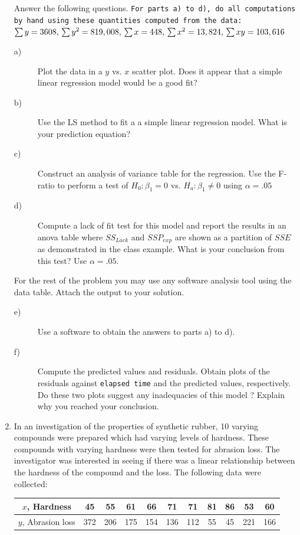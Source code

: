 \documentclass[12pt]{article}
\begin{document}
\begin{enumerate}
Answer the following questions. \texttt{For parts a) to d), do all 
computations by hand using these quantities computed from the data:}
$\sum y =3608, \,\sum y^2 =819,008, \\
\sum x =448, \,\sum x^2=13,824, \,\sum xy = 103,616$
\begin{description}
\item[a)] Plot the data in a $y$ vs. $x$ scatter plot. Does it appear that a simple
linear regression model would be a good fit?
\item[b)] Use the LS method to fit a  a simple
linear regression model. What is your prediction equation?
\item[c)] Construct an analysis of variance table for the regression.
Use the F-ratio to perform a test of $H_0:\beta_1 = 0$ vs. $H_a:\beta_1 \neq 0$
using $\alpha=.05$
\item[d)] Compute a  lack of fit test for this model and report the
results in an  anova table  where $SS_{Lack}$ and
$SSP_{exp}$ are shown as a partition of $SSE$ as demonstrated in the 
class example. What is your conclusion from this test? Use $\alpha=.05$.
\end{description}
For the rest of the problem you may use any software analysis tool using the data table. Attach the output to your solution.
\begin{description}
\item[e)] Use a software to obtain the answers to parts a) to d).
\item[f)] Compute the predicted values and
residuals. Obtain plots of the residuals against \texttt{elapsed time} and the
predicted values, respectively. Do these two plots suggest any 
inadequacies of this model ? Explain why you reached your
conclusion.
\end{description}
\item  In an investigation of the properties of synthetic rubber, 10 varying compounds were prepared which had varying levels of hardness.  These compounds with varying hardness were then tested for abrasion loss.  The investigator was interested in seeing if there was a linear relationship between the hardness of the compound and the loss. The following data were collected:
\begin{center}
\begin{tabular}{ccccccccccc} \hline
$x$, Hardness &  45&55&61&66&71&71&81&86&53&60 \\ \hline
$y$, Abrasion loss &372&206&175&154&136&112&55&45&221&166\\ \hline

\end{tabular}
\end{center}
\end{enumerate}
\end{document}
